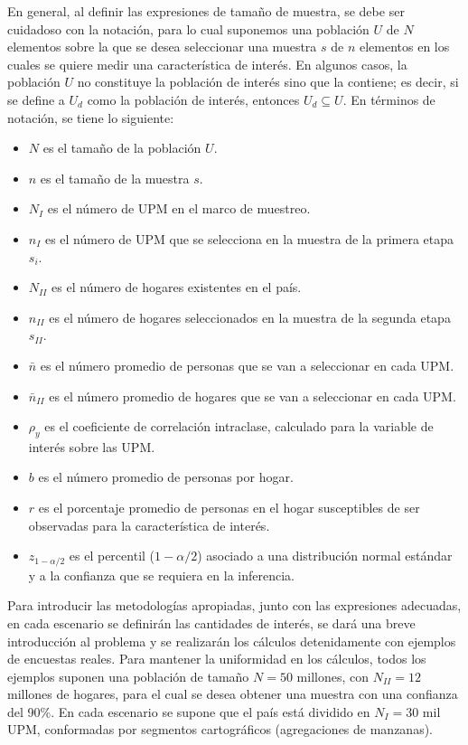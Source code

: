 \documentclass[
  12pt,
]{book}
\providecommand{\tightlist}{%
  \setlength{\itemsep}{0pt}\setlength{\parskip}{0pt}}
\begin{document}
En general, al definir las expresiones de tamaño de muestra, se debe ser cuidadoso con la notación, para lo cual suponemos una población \(U\) de \(N\) elementos sobre la que se desea seleccionar una muestra \(s\) de \(n\) elementos en los cuales se quiere medir una característica de interés. En algunos casos, la población \(U\) no constituye la población de interés sino que la contiene; es decir, si se define a \(U_d\) como la población de interés, entonces \(U_d \subseteq U\). En términos de notación, se tiene lo siguiente:

\begin{itemize}
\tightlist
\item
  \(N\) es el tamaño de la población \(U\).
\item
  \(n\) es el tamaño de la muestra \(s\).
\item
  \(N_{I}\) es el número de UPM en el marco de muestreo.
\item
  \(n_{I}\) es el número de UPM que se selecciona en la muestra de la primera etapa \(s_i\).
\item
  \(N_{II}\) es el número de hogares existentes en el país.
\item
  \(n_{II}\) es el número de hogares seleccionados en la muestra de la segunda etapa \(s_{II}\).
\item
  \(\bar{n}\) es el número promedio de personas que se van a seleccionar en cada UPM.
\item
  \(\bar{n}_{II}\) es el número promedio de hogares que se van a seleccionar en cada UPM.
\item
  \(\rho_y\) es el coeficiente de correlación intraclase, calculado para la variable de interés sobre las UPM.
\item
  \(b\) es el número promedio de personas por hogar.
\item
  \(r\) es el porcentaje promedio de personas en el hogar susceptibles de ser observadas para la característica de interés.
\item
  \(z_{1-\alpha/2}\) es el percentil (\(1- \alpha/2\)) asociado a una distribución normal estándar y a la confianza que se requiera en la inferencia.
\end{itemize}

Para introducir las metodologías apropiadas, junto con las expresiones adecuadas, en cada escenario se definirán las cantidades de interés, se dará una breve introducción al problema y se realizarán los cálculos detenidamente con ejemplos de encuestas reales. Para mantener la uniformidad en los cálculos, todos los ejemplos suponen una población de tamaño \(N=50\) millones, con \(N_{II} = 12\) millones de hogares, para el cual se desea obtener una muestra con una confianza del 90\%. En cada escenario se supone que el país está dividido en \(N_{I} =30\) mil UPM, conformadas por segmentos cartográficos (agregaciones de manzanas).
\end{document}
